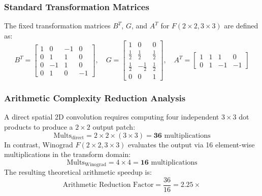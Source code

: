 \documentclass[12pt,a4paper]{article}
\begin{document}
\subsubsection{Standard Transformation Matrices}
The fixed transformation matrices $B^T$, $G$, and $A^T$ for $F(2 \times 2, 3 \times 3)$ are defined as:
\begin{equation}
    B^T = \begin{bmatrix}
        1 & 0  & -1 & 0  \\
        0 & 1  & 1  & 0  \\
        0 & -1 & 1  & 0  \\
        0 & 1  & 0  & -1
    \end{bmatrix}, \quad
    G = \begin{bmatrix}
        1           & 0            & 0           \\
        \frac{1}{2} & \frac{1}{2}  & \frac{1}{2} \\
        \frac{1}{2} & -\frac{1}{2} & \frac{1}{2} \\
        0           & 0            & 1
    \end{bmatrix}, \quad
    A^T = \begin{bmatrix}
        1 & 1 & 1  & 0  \\
        0 & 1 & -1 & -1
    \end{bmatrix}
\end{equation}

\subsubsection{Arithmetic Complexity Reduction Analysis}
A direct spatial 2D convolution requires computing four independent $3 \times 3$ dot products to produce a $2 \times 2$ output patch:
\begin{equation}
    \text{Mults}_{\text{direct}} = 2 \times 2 \times (3 \times 3) = \mathbf{36} \text{ multiplications}
\end{equation}
In contrast, Winograd $F(2 \times 2, 3 \times 3)$ evaluates the output via 16 element-wise multiplications in the transform domain:
\begin{equation}
    \text{Mults}_{\text{Winograd}} = 4 \times 4 = \mathbf{16} \text{ multiplications}
\end{equation}
The resulting theoretical arithmetic speedup is:
\begin{equation}
    \text{Arithmetic Reduction Factor} = \frac{36}{16} = \mathbf{2.25\times}
\end{equation}
\end{document}
